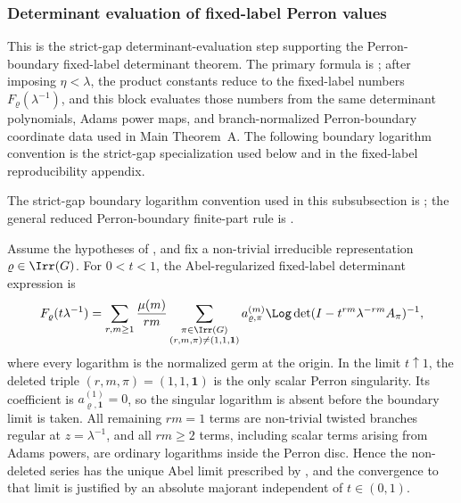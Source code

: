 \subsubsection{Determinant evaluation of fixed-label Perron values}
\label{subsubsec:determinant-only-fixed-label-values}

This is the strict-gap determinant-evaluation step supporting the
Perron-boundary fixed-label determinant theorem.  The primary formula is
; after imposing
\(\eta<\lambda\), the product constants reduce to the fixed-label numbers
\(F_\varrho(\lambda^{-1})\), and this block evaluates those numbers from the
same determinant polynomials, Adams power maps, and branch-normalized
Perron-boundary coordinate data used in Main Theorem~A.  The following
boundary logarithm convention is the strict-gap specialization used below and
in the fixed-label reproducibility appendix.

The strict-gap boundary logarithm convention used in this subsubsection is
; the general reduced
Perron-boundary finite-part rule is
.


\begin{lemma}
  \label{lem:fixed-label-singular-triple-deletion}
  Assume the hypotheses of , and fix a
  non-trivial irreducible representation \(\varrho\in\Irr(G)\).  For
  \(0<t<1\), the Abel-regularized fixed-label determinant expression is
  \begin{equation}\label{eq:fixed-label-singular-deletion-abel}
    F_\varrho(t\lambda^{-1})
    =
    \sum_{r,m\ge1}\frac{\mu(m)}{rm}
      \sum_{\substack{\pi\in\Irr(G)\\(r,m,\pi)\neq(1,1,\mathbf1)}}
        a_{\varrho,\pi}^{(m)}
        \Log\det(I-t^{rm}\lambda^{-rm}A_\pi)^{-1},
  \end{equation}
  where every logarithm is the normalized germ at the origin.  In the limit
  \(t\uparrow1\), the deleted triple \((r,m,\pi)=(1,1,\mathbf1)\) is the
  only scalar Perron singularity. Its coefficient is
  \(a_{\varrho,\mathbf1}^{(1)}=0\), so the singular logarithm is absent
  before the boundary limit is taken.  All remaining \(rm=1\) terms are
  non-trivial twisted branches regular at \(z=\lambda^{-1}\), and all
  \(rm\ge2\) terms, including scalar terms arising from Adams powers, are
  ordinary logarithms inside the Perron disc.  Hence the non-deleted series
  has the unique Abel limit prescribed by
  , and the convergence to
  that limit is justified by an absolute majorant independent of \(t\in(0,1)\).
\end{lemma}

